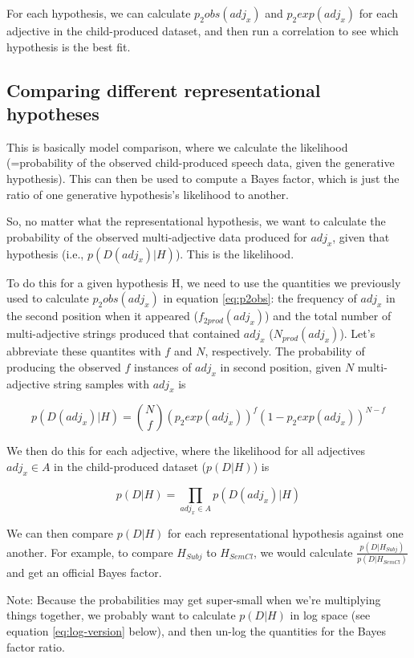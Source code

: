 \documentclass{article}
\begin{document}
For each hypothesis, we can calculate $p_2obs(adj_x)$ and $p_2exp(adj_x)$ for each adjective in the child-produced dataset, and then run a correlation to see which hypothesis is the best fit.


\subsection{Comparing different representational hypotheses}
This is basically model comparison, where we calculate the likelihood (=probability of the observed child-produced speech data, given the generative hypothesis). This can then be used to compute a Bayes factor, which is just the ratio of one generative hypothesis's likelihood to another.

So, no matter what the representational hypothesis, we want to calculate the probability of the observed multi-adjective data produced for $adj_x$, given that hypothesis (i.e., $p(D(adj_x)|H)$). This is the likelihood.

To do this for a given hypothesis H, we need to use the quantities we previously used to calculate $p_2obs(adj_x)$ in equation \eqref{eq:p2obs}: the frequency of $adj_x$ in the second position when it appeared ($f_{2prod}(adj_x)$) and the total number of multi-adjective strings produced that contained $adj_x$ ($N_{prod}(adj_x)$). Let's abbreviate these quantites with $f$ and $N$, respectively. The probability of producing the observed $f$ instances of $adj_x$ in second position, given $N$ multi-adjective string samples with $adj_x$ is 

\begin{equation}
\label{eq:likelihood}
p(D(adj_x)|H) = \binom{N}{f}(p_2exp(adj_x))^f(1-p_2exp(adj_x))^{N-f}
\end{equation}

We then do this for each adjective, where the likelihood for all adjectives $adj_x \in A$ in the child-produced dataset ($p(D|H)$) is

\begin{equation}
p(D|H) = \prod_{adj_x\in A} p(D(adj_x)|H)
\end{equation}

We can then compare $p(D|H)$ for each representational hypothesis against one another. For example, to compare $H_{Subj}$ to $H_{SemCl}$, we would calculate $\frac{p(D|H_{Subj})}{p(D|H_{SemCl})}$ and get an official Bayes factor. 

Note: Because the probabilities may get super-small when we're multiplying things together, we probably want to calculate $p(D|H)$ in log space (see equation \eqref{eq:log-version} below), and then un-log the quantities for the Bayes factor ratio.
\end{document}
